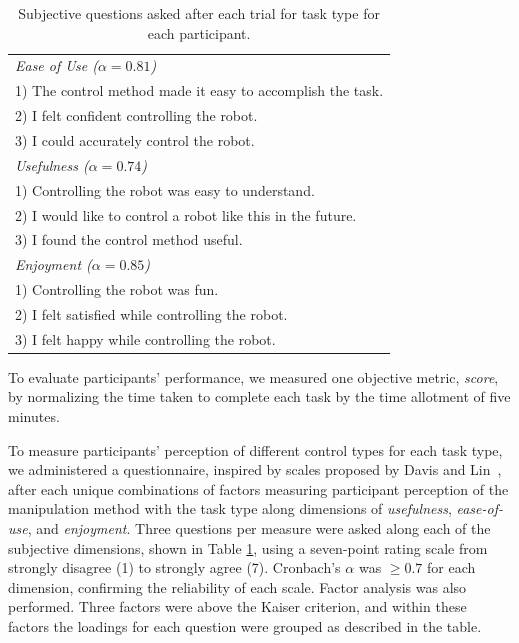 \documentclass{sigchi}
\newcommand{\ra}[1]{\renewcommand{\arraystretch}{#1}}
\begin{document}
\begin{table}[t]
\centering
\ra{1.2}
\begin{tabular}{@{}l@{}}
\toprule
\em{Ease of Use} ($\alpha = 0.81$) \\
1) The control method made it easy to accomplish the task. \\
2) I felt confident controlling the robot. \\
3) I could accurately control the robot. \\
\midrule
\em{Usefulness} ($\alpha = 0.74$) \\
1) Controlling the robot was easy to understand. \\
2) I would like to control a robot like this in the future. \\
3) I found the control method useful. \\
\midrule
\em{Enjoyment} ($\alpha = 0.85$) \\
1) Controlling the robot was fun. \\
2) I felt satisfied while controlling the robot. \\
3) I felt happy while controlling the robot. \\
\bottomrule
\end{tabular}
\caption{Subjective questions asked after each trial for task type for each participant. \label{tab:subjective}}
\end{table}


To evaluate participants' performance, we measured one objective metric, \textit{score}, by normalizing the time taken to complete each task by the time allotment of five minutes.

To measure participants' perception of different control types for each task type, we administered a questionnaire, inspired by scales proposed by Davis and Lin~\cite{Davis1989, Lin2008}, after each unique combinations of factors measuring participant perception of the manipulation method with the task type along dimensions of \textit{usefulness}, \textit{ease-of-use}, and \textit{enjoyment}. Three questions per measure were asked along each of the subjective dimensions, shown in Table \ref{tab:subjective}, using a seven-point rating scale from strongly disagree (1) to strongly agree (7). Cronbach's $\alpha$ was $\geq0.7$ for each dimension, confirming the reliability of each scale. Factor analysis was also performed. Three factors were above the Kaiser criterion, and within these factors the loadings for each question were grouped as described in the table.
\end{document}

